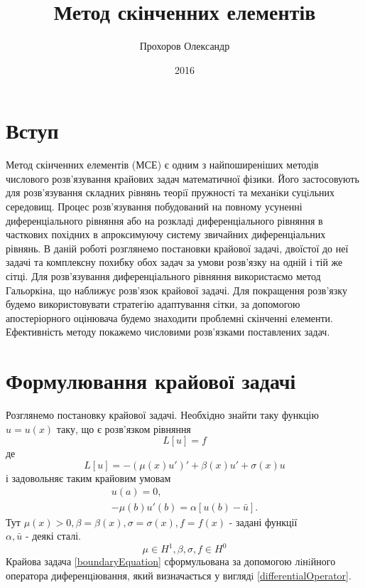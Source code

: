 \documentclass[a4paper]{article}
\title{Метод скінченних елементів}
\author{Прохоров Олександр}
\date{2016}
\numberwithin{equation}{section}
\begin{document}
\hfill
\tableofcontents
\newpage
\section{Вступ}
Метод скінченних елементів (МСЕ) є одним з найпоширеніших методів числового розв’язування крайових задач математичної фізики. Його застосовують для розв’язування складних рiвнянь теорiї пружностi та механiки суцiльних середовищ. Процес розв’язування побудований на повному усуненні диференціального рівняння або на розкладі диференціального рівняння в часткових похід\-них в апроксимуючу систему звичайних диференціальних рівнянь.
В даній роботі розглянемо постановки крайової задачі, двоїстої до неї задачі та комплексну похибку обох задач за умови розв'язку на одній і тій же сітці.
Для розв’язування диференці\-ального рівняння використаємо метод Гальоркіна, що наближує розв’язок крайової задачі. Для покращення розв’язку будемо використовувати стратегію адаптування сітки, за допомогою апосте\-ріорного оцінювача будемо знаходити проблемні скінченні елементи. Ефективність методу покаже\-мо числовими розв’язками поставлених задач.

\section{Формулювання крайової задачі}
Розглянемо постановку крайової задачі. Необхідно знайти таку функцію $u=u(x)$ таку, що є розв’язком рівняння
\begin{equation}\label{boundaryEquation}
L[u]=f
\end{equation}
де
\begin{equation}\label{differentialOperator}
L[u]=-(\mu(x)u')'+\beta(x)u'+\sigma(x)u
\end{equation}
і задовольняє таким крайовим умовам
\begin{equation}\label{boundaryCondition}
\begin{split}
u(a)=0,\\
-\mu(b)u'(b)=\alpha[u(b)-\bar{u}].
\end{split}
\end{equation}
Тут $\mu(x)>0, \beta=\beta(x), \sigma=\sigma(x),f=f(x)$ - задані функції\\
$\alpha, \bar{u}$ - деякі сталі.
\begin{equation}
\mu \in H^1, \beta, \sigma, f\in H^0
\end{equation}
Крайова задача \ref{boundaryEquation} сформульована за допомогою лiнiйного оператора диференцiювання, який визначається у виглядi \ref{differentialOperator}.
\end{document}
